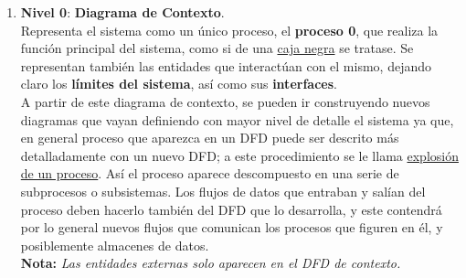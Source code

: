 \begin{enumerate}
    \item \textbf{Nivel 0}: \textbf{Diagrama de Contexto}.\\
          Representa el sistema como un único proceso, el \textbf{proceso 0}, que realiza la función principal del sistema, como si de una \uline{caja negra} se tratase. Se representan también las entidades que interactúan con el mismo, dejando claro los \textbf{límites del sistema}, así como sus \textbf{interfaces}.\\
          
          A partir de este diagrama de contexto, se pueden ir construyendo nuevos diagramas que vayan definiendo con mayor nivel de detalle el sistema ya que, en general proceso que aparezca en un DFD puede ser descrito más detalladamente con un nuevo DFD; a este procedimiento se le llama \uline{explosión de un proceso}. Así el proceso aparece descompuesto en una serie de subprocesos o subsistemas. Los flujos de datos que entraban y salían del proceso deben hacerlo también del DFD que lo desarrolla, y este contendrá por lo general nuevos flujos que comunican los procesos que figuren en él, y posiblemente almacenes de datos.\\

          \textbf{Nota:} \textit{Las entidades externas solo aparecen en el DFD de contexto.}


\end{enumerate}
